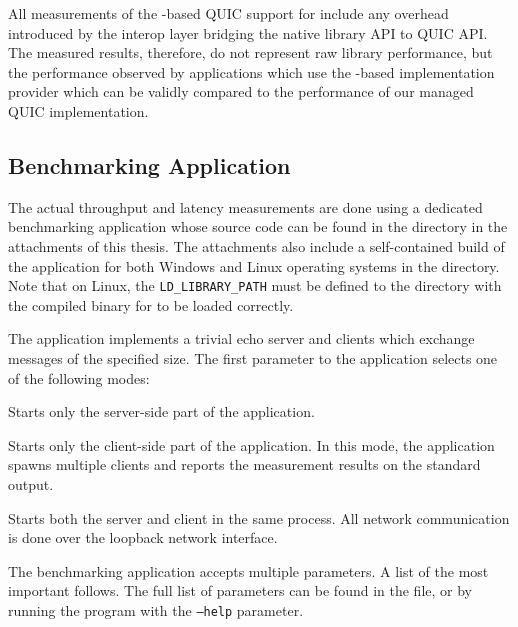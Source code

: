 All measurements of the \libmsquic{}-based QUIC support for \dotnet{} include any overhead
introduced by the interop layer bridging the native library API to \dotnet{} QUIC API\@. The
measured results, therefore, do not represent raw \libmsquic{} library performance, but the
performance observed by \dotnet{} applications which use the \libmsquic{}-based implementation
provider which can be validly compared to the performance of our managed QUIC implementation.

\subsection{Benchmarking Application}\label{sec:04-benchmark-app}

The actual throughput and latency measurements are done using a dedicated benchmarking \dotnet{}
application whose source code can be found in the
 directory in the attachments of this thesis.
The attachments also include a self-contained build of the application for both Windows and Linux
operating systems in the  directory. Note that on Linux,
the \texttt{LD_LIBRARY_PATH} must be defined to the directory with the compiled binary for
\libmsquic{} to be loaded correctly.

The application implements a trivial echo server and clients which exchange messages of the
specified size. The first parameter to the application selects one of the following modes:

\begin{description}

   Starts only the server-side part of the application.

   Starts only the client-side part of the application. In this mode, the
application spawns multiple clients and reports the measurement results on the standard output.

   Starts both the server and client in the same process. All network
communication is done over the loopback network interface.

\end{description}

The benchmarking application accepts multiple parameters. A list of the most important follows. The
full list of parameters can be found in the  file, or by running the program
with the \texttt{--help} parameter.

